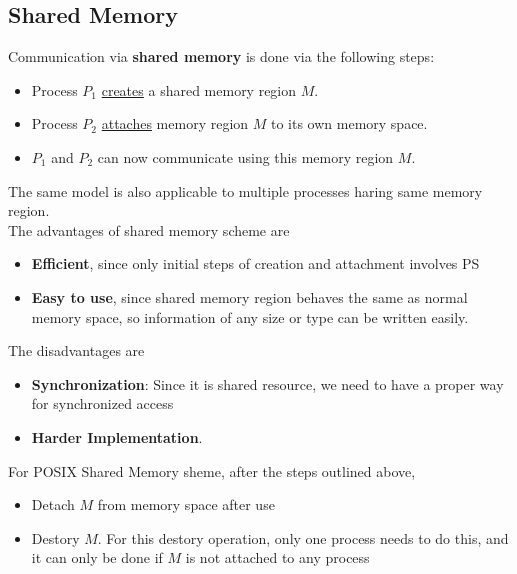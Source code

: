 \documentclass[11pt]{article}
\theoremstyle{definition}
\begin{document}
\subsection{Shared Memory}
Communication via \textbf{shared memory} is done via the following steps:
\begin{itemize}[itemsep=0pt]
  \item Process $P_1$ \underline{creates} a shared memory region $M$.
  \item Process $P_2$ \underline{attaches} memory region $M$ to its own memory space.
  \item $P_1$ and $P_2$ can now communicate using this memory region $M$.
\end{itemize}
The same model is also applicable to multiple processes haring same memory region.\\
The advantages of shared memory scheme are
\begin{itemize}[itemsep=0pt]
  \item \textbf{Efficient}, since only initial steps of creation and attachment involves PS
  \item \textbf{Easy to use}, since shared memory region behaves the same as normal memory space, so information of any size or type can be written easily.
\end{itemize}
The disadvantages are
\begin{itemize}[itemsep=0pt]
  \item \textbf{Synchronization}: Since it is shared resource, we need to have a proper way for synchronized access
  \item \textbf{Harder Implementation}.
\end{itemize}
For POSIX Shared Memory sheme, after the steps outlined above,
\begin{itemize}[itemsep=0pt]
  \item Detach $M$ from memory space after use
  \item Destory $M$. For this destory operation, only one process needs to do this, and it can only be done if $M$ is not attached to any process
\end{itemize}
\end{document}
